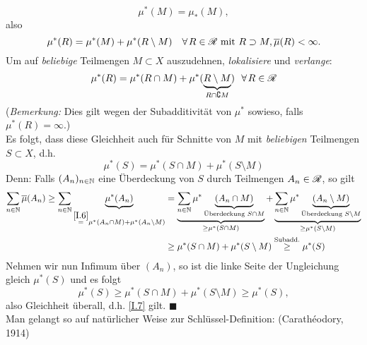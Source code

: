 $$
\mu^*(M)=\mu_*(M),
$$
also
$$
\mu^*(R)=\mu^*(M)+\mu^*(R\setminus M)		\quad \forall R \in \RR \text{ mit } R \supset M, \ol\mu(R)<\infty.
$$
Um auf \emph{beliebige} Teilmengen $M\subset X$ auszudehnen, \emph{lokalisiere} und \emph{verlange}:
\begin{equation}\label{I.6}
\mu^*(R)=\mu^*(R\cap M) + \mu^*(\underbrace{R\setminus M}_{R\cap \complement M}) \ \ \forall R \in \RR
\end{equation}
(\textit{Bemerkung:} Dies gilt wegen der Subadditivität von $\mu^*$ sowieso, falls $\mu^*(R)=\infty$.)\\
Es folgt, dass diese Gleichheit auch für Schnitte von $M$ mit \emph{beliebigen} Teilmengen $S \subset X$, d.h.
\begin{equation}\label{I.7}
\boxed{
\mu^*(S)=\mu^*(S\cap M) + \mu^*(S \setminus M)
}
\end{equation}
Denn: Falls $(A_n)_{n \in \mathbb{N}}$ eine Überdeckung von $S$ durch Teilmengen $A_n \in \mathscr{R}$, so gilt 
\begin{equation*}
\begin{split}
\sum_{n\in\mathbb{N}}\overline\mu(A_n) \geq \sum_{n\in\mathbb{N}}\underbrace{\mu^*(A_n)}_{\overset{\eqref{I.6}}= \mu^*(A_n \cap M)+\mu^*(A_n \setminus M)} & = \underbrace{\sum_{n\in\mathbb{N}}\mu^*\underbrace{(A_n \cap M)}_{\text{Überdeckung } S\cap M}}_{\geq \mu^*(S\cap M)}+\underbrace{\sum_{n\in \mathbb{N}}\mu^*\underbrace{(A_n\setminus M)}_{\text{Überdeckung }S\setminus M}}_{\geq \mu^*(S\setminus M)} \\
& \geq  \mu^*(S\cap M) + \mu^*(S \setminus M) \overset{\text{Subadd.}}{\geq} \mu^*(S)
\end{split}
\end{equation*}
Nehmen wir nun Infimum über $(A_n)$, so ist die linke Seite der Ungleichung gleich $\mu^*(S)$ und es folgt
$$\mu^*(S)\geq \mu^*(S\cap M) + \mu^*(S \setminus M) \geq \mu^*(S),$$
also Gleichheit überall, d.h. \eqref{I.7} gilt. $\blacksquare$\\

Man gelangt so auf natürlicher Weise zur Schlüssel-Definition: (Carathéodory, 1914)

